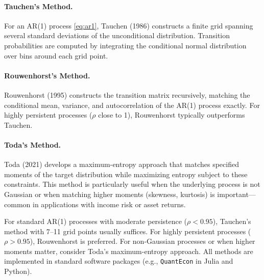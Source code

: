 \paragraph{Tauchen's Method.}
For an AR(1) process \eqref{eq:ar1}, Tauchen (1986) constructs a finite grid spanning several standard deviations of the unconditional distribution. Transition probabilities are computed by integrating the conditional normal distribution over bins around each grid point.

\paragraph{Rouwenhorst's Method.}
Rouwenhorst (1995) constructs the transition matrix recursively, matching the conditional mean, variance, and autocorrelation of the AR(1) process exactly. For highly persistent processes ($\rho$ close to 1), Rouwenhorst typically outperforms Tauchen.

\paragraph{Toda's Method.}
Toda (2021) develops a maximum-entropy approach that matches specified moments of the target distribution while maximizing entropy subject to these constraints. This method is particularly useful when the underlying process is not Gaussian or when matching higher moments (skewness, kurtosis) is important---common in applications with income risk or asset returns.

\begin{callouttip}
For standard AR(1) processes with moderate persistence ($\rho < 0.95$), Tauchen's method with 7--11 grid points usually suffices. For highly persistent processes ($\rho > 0.95$), Rouwenhorst is preferred. For non-Gaussian processes or when higher moments matter, consider Toda's maximum-entropy approach. All methods are implemented in standard software packages (e.g., \texttt{QuantEcon} in Julia and Python).
\end{callouttip}

